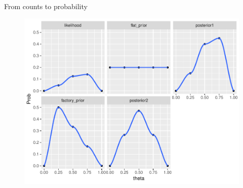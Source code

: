 \documentclass[handout]{beamer}
\begin{document}
\begin{frame}{From counts to probability}
\scriptsize{
\begin{figure}[h!]
	\centering
	\includegraphics[scale=0.63]{pics/marbles_dist.pdf}
\end{figure}
 } 
 

\end{frame}
\end{document}
